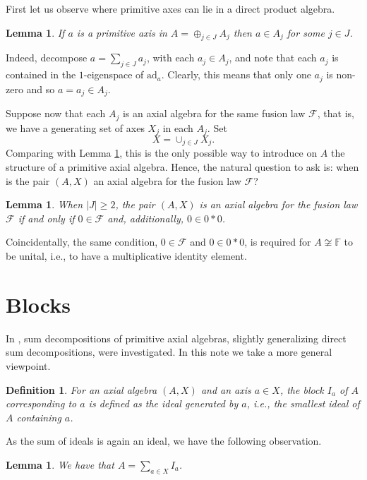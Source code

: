 \documentclass[12pt]{article}
\newtheorem{lemma}[theorem]{Lemma}
\newtheorem{definition}[theorem]{Definition}
\newcommand\F{\mathbb{F}}
\newcommand\cF{\mathcal{F}}
\newcommand\ad{\mathrm{ad}}
\begin{document}
First let us observe where primitive axes can lie in a direct product algebra.

\begin{lemma} \label{primitive}
If $a$ is a primitive axis in $A=\oplus_{j\in J}A_j$ then $a\in A_j$ for some 
$j\in J$.
\end{lemma}

Indeed, decompose $a=\sum_{j\in J} a_j$, with each $a_j\in A_j$, and note that each 
$a_j$ is contained in the $1$-eigenspace of $\ad_a$. Clearly, this means that only 
one $a_j$ is non-zero and so $a=a_j\in A_j$.

Suppose now that each $A_j$ is an axial algebra for the same fusion law 
$\cF$, that is, we have a generating set of axes $X_j$ in each 
$A_j$. Set 
%
$$X=\cup_{j\in J}X_j.$$
%
Comparing with Lemma \ref{primitive}, this is the only possible way to introduce on 
$A$ the structure of a primitive axial algebra. Hence, the natural question to ask 
is: when is the pair $(A,X)$ an axial algebra for the fusion law $\cF$?

\begin{lemma} \label{direct sum}
When $|J|\geq 2$, the pair $(A,X)$ is an axial algebra for the 
fusion law $\cF$ if and only if $0\in\cF$ and, additionally, $0\in 
0\ast 0$.
\end{lemma}

Coincidentally, the same condition, $0\in\cF$ and $0\in 0\ast 0$, is required for 
$A\not\cong\F$ to be unital, i.e., to have a multiplicative identity element.

\section{Blocks} \label{blocks}

In \cite{kms}, sum decompositions of primitive axial algebras, slightly generalizing 
direct sum decompositions, were investigated. In this note we take a more general 
viewpoint. 

\begin{definition} \label{block}
For an axial algebra $(A,X)$ and an axis $a\in X$, the \emph{block} $I_a$ of $A$ 
corresponding to $a$ is defined as the ideal generated by $a$, i.e., the smallest 
ideal of $A$ containing $a$.
\end{definition}

As the sum of ideals is again an ideal, we have the following observation.

\begin{lemma} \label{block decomposition}
We have that $A=\sum_{a\in X}I_a$.
\end{lemma}
\end{document}
